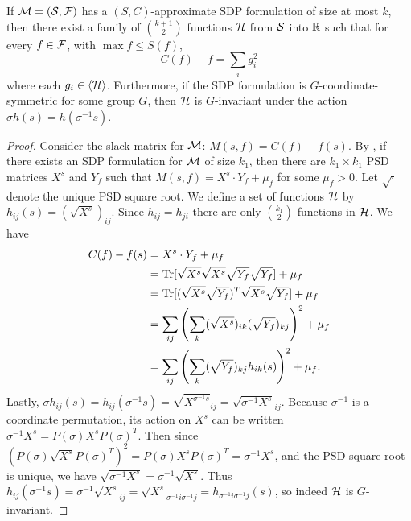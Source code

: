 \begin{lemma}\label{lem:sdptosos}
If $\mathcal M = (\mathcal S, \mathcal F)$ has a $(S,C)$-approximate SDP formulation of size at most $k$, then there exist a family of $\binom{k+1}{2}$ functions $\mathcal H$ from $\mathcal S$ into $\mathbb R$ such that for every $f \in \mathcal F$, with $\max f \leq S(f)$,
\[C(f) - f = \sum_i g_i^2\]
where each $g_i \in \langle \mathcal H \rangle$. Furthermore, if the SDP formulation is $G$-coordinate-symmetric for some group $G$, then $\mathcal H$ is $G$-invariant under the action $\sigma h(s) = h(\sigma^{-1}s)$.
\end{lemma} 
\begin{proof}
Consider the slack matrix for $\mathcal M$: $M(s,f) = C(f) - f(s)$. By , if there exists an SDP formulation for $\mathcal M$ of size $k_1$, then there are $k_1 \times k_1$ PSD matrices $X^s$ and $Y_f$ such that $M(s,f) = X^s \cdot Y_f + \mu_f$ for some $\mu_f > 0$. Let $\sqrt{\cdot}$ denote the unique PSD square root. We define a set of functions $\mathcal H$ by $h_{ij}(s) = (\sqrt{X^s})_{ij}$. Since $h_{ij} = h_{ji}$ there are only $\binom{k_1}{2}$ functions in $\mathcal H$. We have
\begin{align*}
C(f) - f(s) &= X^s \cdot Y_f + \mu_f \\
&= \operatorname{Tr}[\sqrt{X^s}\sqrt{X^s}\sqrt{Y_f}\sqrt{Y_f}] + \mu_f \\
&= \operatorname{Tr}[(\sqrt{X^s}\sqrt{Y_f})^T\sqrt{X^s}\sqrt{Y_f}] + \mu_f \\
&= \sum_{ij} \left(\sum_k (\sqrt{X^s})_{ik}(\sqrt{Y_f})_{kj}\right)^2 + \mu_f \\
&= \sum_{ij} \left(\sum_k (\sqrt{Y_f})_{kj}h_{ik}(s)\right)^2 + \mu_f.
\end{align*}
Lastly, $\sigma h_{ij}(s) = h_{ij}(\sigma^{-1}s) = \sqrt{X^{\sigma^{-1}s}}_{ij} = \sqrt{\sigma^{-1}X^s}_{ij}$. Because $\sigma^{-1}$ is a coordinate permutation, its action on $X^s$ can be written $\sigma^{-1} X^s = P(\sigma) X^s P(\sigma)^T$. Then since $\left(P(\sigma)\sqrt{X^s}P(\sigma)^T\right)^2 = P(\sigma)X^sP(\sigma)^T = \sigma^{-1}X^s$, and the PSD square root is unique, we have $\sqrt{\sigma^{-1}X^s} = \sigma^{-1}\sqrt{X^s}$. Thus $h_{ij}(\sigma^{-1}s) = \sigma^{-1}\sqrt{X^s}_{ij} = \sqrt{X^s}_{\sigma^{-1}i\sigma^{-1}j} = h_{\sigma^{-1}i\sigma^{-1}j}(s)$, so indeed $\mathcal H$ is $G$-invariant. 
\end{proof}

